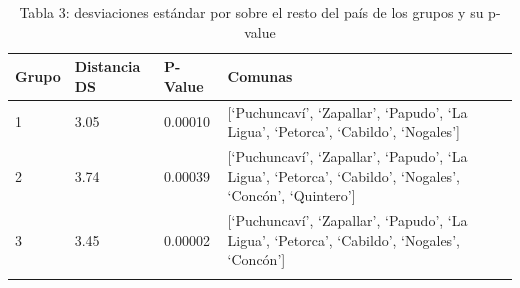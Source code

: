 \documentclass[]{article}
\begin{document}
\begin{longtable}[]{@{}llll@{}}
\toprule
\begin{minipage}[b]{0.22\columnwidth}\raggedright
Grupo\strut
\end{minipage} & \begin{minipage}[b]{0.22\columnwidth}\raggedright
Distancia DS\strut
\end{minipage} & \begin{minipage}[b]{0.22\columnwidth}\raggedright
P-Value\strut
\end{minipage} & \begin{minipage}[b]{0.22\columnwidth}\raggedright
Comunas\strut
\end{minipage}\tabularnewline
\midrule
\endhead
\begin{minipage}[t]{0.22\columnwidth}\raggedright
1\strut
\end{minipage} & \begin{minipage}[t]{0.22\columnwidth}\raggedright
3.05\strut
\end{minipage} & \begin{minipage}[t]{0.22\columnwidth}\raggedright
0.00010\strut
\end{minipage} & \begin{minipage}[t]{0.22\columnwidth}\raggedright
{[}`Puchuncaví', `Zapallar', `Papudo', `La Ligua', `Petorca', `Cabildo',
`Nogales'{]}\strut
\end{minipage}\tabularnewline
\begin{minipage}[t]{0.22\columnwidth}\raggedright
2\strut
\end{minipage} & \begin{minipage}[t]{0.22\columnwidth}\raggedright
3.74\strut
\end{minipage} & \begin{minipage}[t]{0.22\columnwidth}\raggedright
0.00039\strut
\end{minipage} & \begin{minipage}[t]{0.22\columnwidth}\raggedright
{[}`Puchuncaví', `Zapallar', `Papudo', `La Ligua', `Petorca', `Cabildo',
`Nogales', `Concón', `Quintero'{]}\strut
\end{minipage}\tabularnewline
\begin{minipage}[t]{0.22\columnwidth}\raggedright
3\strut
\end{minipage} & \begin{minipage}[t]{0.22\columnwidth}\raggedright
3.45\strut
\end{minipage} & \begin{minipage}[t]{0.22\columnwidth}\raggedright
0.00002\strut
\end{minipage} & \begin{minipage}[t]{0.22\columnwidth}\raggedright
{[}`Puchuncaví', `Zapallar', `Papudo', `La Ligua', `Petorca', `Cabildo',
`Nogales', `Concón'{]}\strut
\end{minipage}\tabularnewline
\bottomrule
\caption{Tabla 3: desviaciones estándar por sobre el resto del país de los grupos y su p-value}
\end{longtable}
\end{document}
